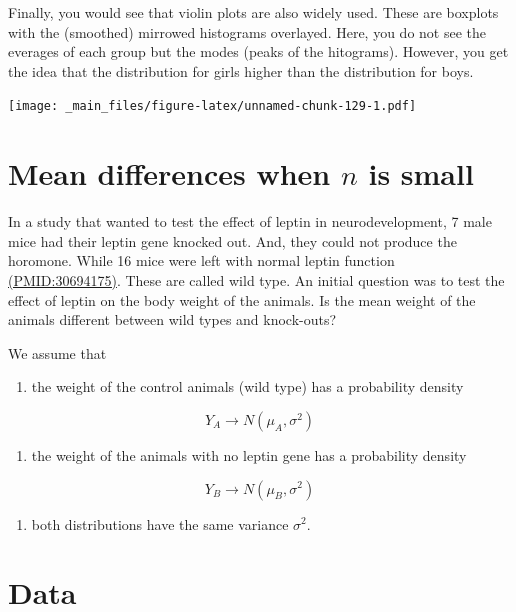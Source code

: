 \documentclass[
]{book}
\providecommand{\tightlist}{%
  \setlength{\itemsep}{0pt}\setlength{\parskip}{0pt}}
\begin{document}
Finally, you would see that violin plots are also widely used. These are boxplots with the (smoothed) mirrowed histograms overlayed. Here, you do not see the everages of each group but the modes (peaks of the hitograms). However, you get the idea that the distribution for girls higher than the distribution for boys.

\texttt{[image: \_main\_files/figure-latex/unnamed-chunk-129-1.pdf]}

\hypertarget{mean-differences-when-n-is-small}{%
\section{\texorpdfstring{Mean differences when \(n\) is small}{Mean differences when n is small}}\label{mean-differences-when-n-is-small}}

In a study that wanted to test the effect of leptin in neurodevelopment, 7 male mice had their leptin gene knocked out. And, they could not produce the horomone. While 16 mice were left with normal leptin function \href{https://pubmed.ncbi.nlm.nih.gov/30694175/}{(PMID:30694175)}. These are called wild type. An initial question was to test the effect of leptin on the body weight of the animals. Is the mean weight of the animals different between wild types and knock-outs?

We assume that

\begin{enumerate}
\def\labelenumi{\arabic{enumi}.}
\tightlist
\item
  the weight of the control animals (wild type) has a probability density
\end{enumerate}

\[Y_A \rightarrow N(\mu_A, \sigma^2)\]

\begin{enumerate}
\def\labelenumi{\arabic{enumi}.}
\setcounter{enumi}{1}
\tightlist
\item
  the weight of the animals with no leptin gene has a probability density
\end{enumerate}

\[Y_B \rightarrow N(\mu_B, \sigma^2)\]

\begin{enumerate}
\def\labelenumi{\arabic{enumi}.}
\setcounter{enumi}{2}
\tightlist
\item
  both distributions have the same variance \(\sigma^2\).
\end{enumerate}

\hypertarget{data-2}{%
\section{Data}\label{data-2}}
\end{document}
